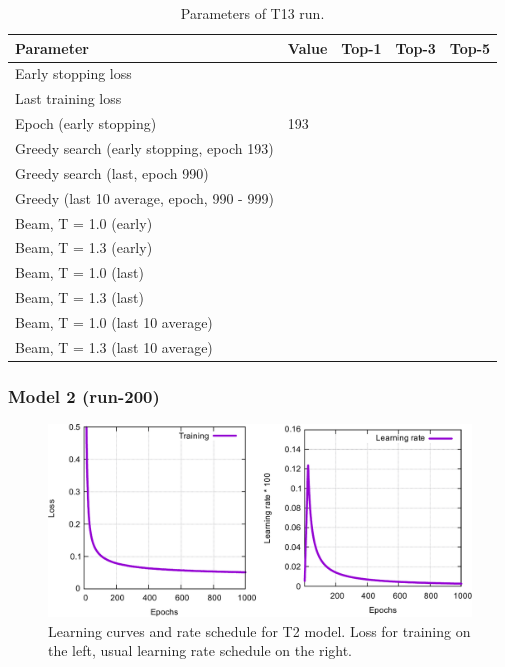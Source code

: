 \documentclass{article}
\begin{document}
\begin{table}[h!]
\caption{Parameters of T13 run.}
  \centering
  \begin{tabular}{p{8.2cm}p{1.5cm}p{1.5cm}p{1.5cm}p{1.5cm}}
    \toprule
    Parameter & Value & Top-1 & Top-3 & Top-5 \\
    \midrule
    Early stopping loss &  & & & \\
    Last training loss &  & & & \\
    Epoch (early stopping) & 193 & & & \\
    \midrule
    Greedy search (early stopping, epoch 193) &  &  & &\\
    Greedy search (last, epoch 990) &  &  & & \\
    Greedy (last 10 average, epoch, 990 - 999) & &  & & \\
    \midrule
    Beam, T = 1.0 (early) & &  &  &  \\
    Beam, T = 1.3 (early) & &  &  &  \\ 
    \midrule
    Beam, T = 1.0 (last) & &  &  &   \\
    Beam, T = 1.3 (last) & &  &  &  \\ 
    \midrule
    Beam, T = 1.0 (last 10 average) & &  &  &   \\
    Beam, T = 1.3 (last 10 average) & &  &  &  \\ 
    \bottomrule
  \end{tabular}
  \label{tbl:t12}

\end{table} 


\newpage
 \subsubsection{Model 2 (run-200)}
 
\begin{figure}[h!]
  \centering
  \includegraphics[width = 16.5cm]{images/t2-1.pdf}
  \caption{Learning curves and rate schedule for T2 model. Loss for training on the left, usual learning rate schedule on the right.}
  \label{fig:t21}
\end{figure}
\end{document}
